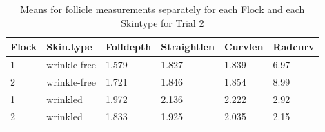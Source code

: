 %

\begin{table}[ht]
\centering
\caption{Means for follicle measurements separately for each Flock and each Skintype for Trial 2}
\label{tab:curvmeasmeans}
\vspace{0.1in}
\begin{tabular}{|p{0.5in}|p{0.6in}|p{0.6in}|p{0.6in}|p{0.6in}|p{0.6in}|} \hline
  Flock & Skin.type & Folldepth & Straightlen & Curvlen  & Radcurv\\   
    \hline
  1 & wrinkle-free & 1.579 & 1.827 & 1.839 & 6.97  \\ 
  2 & wrinkle-free & 1.721 & 1.846 & 1.854 & 8.99  \\ 
  1 & wrinkled & 1.972 & 2.136 & 2.222 & 2.92 \\ 
  2 & wrinkled & 1.833 & 1.925 & 2.035 & 2.15  \\ 
   \hline
\end{tabular}
\end{table}

%


